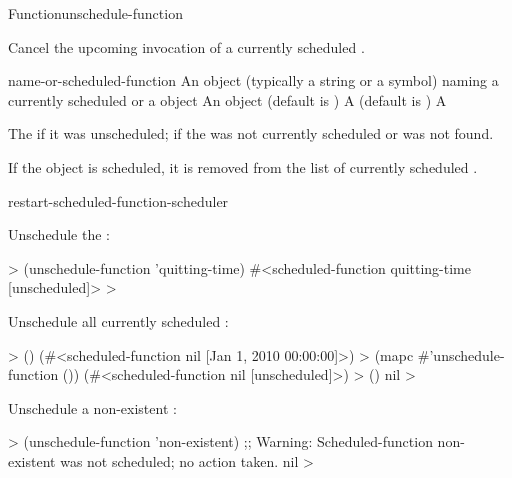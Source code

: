 \begin{functiondoc}{Function}{unschedule-function}%
  {
     
  \returns{} } 
%
%
%
%

\fnsyntax

\fnpurpose Cancel the upcoming invocation of a currently scheduled
.

\fnpackage {}

\fnmodule {}

\fnargs
\begin{args}{name-or-scheduled-function}
 An object (typically a string or a
  symbol) naming a currently scheduled  or a
   object
\arg[key] An object (default is \nil)
\arg[verbose] A  
  (default is )
\arg[boolean] A 
\end{args}

\fnreturns The  if it was unscheduled; \nil{} if the 
 was not currently scheduled or was not found.

\fnerrors
\nothreads{}

\fndescription If the  object is scheduled,
it is removed from the list of currently scheduled
.

\begin{alsos}{restart-scheduled-function-scheduler}
\end{alsos}

\fnexamples
Unschedule the  :
%
\W\supp
\begin{example}
  > (unschedule-function 'quitting-time)
  #<scheduled-function quitting-time [unscheduled]>
  >
\end{example}
%
%
%
Unschedule all currently scheduled :
%
\W\supp\notpretop
\begin{example}
  > ()
  (#<scheduled-function nil [Jan 1, 2010 00:00:00]>)
  > (mapc #'unschedule-function ())
  (#<scheduled-function nil [unscheduled]>)
  > ()
  nil
  >
\end{example}
%
Unschedule a non-existent :
%
\W\supp\notpretop
\begin{example}
  > (unschedule-function 'non-existent)
  ;; Warning: Scheduled-function non-existent was not scheduled; no action taken.
  nil
  >
\end{example}

\end{functiondoc}

